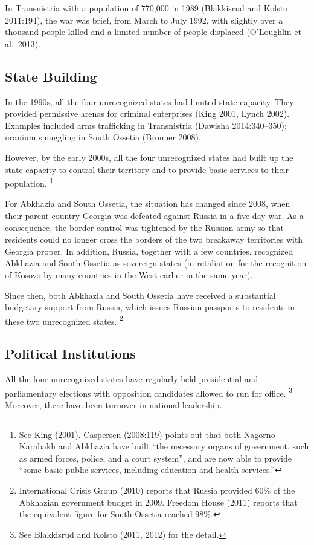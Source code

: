 \documentclass[12pt,a4paper]{article}%
\begin{document}
In Transnistria with a population of 770,000 in 1989 (Blakkisrud and Kolsto 2011:194), the war was brief, from March to July 1992, with slightly over a thousand people killed and a limited number of people displaced (O'Loughlin et al.\ 2013). 

\subsection{State Building}\label{state-building}
In the 1990s, all the four unrecognized states had limited state capacity.
They provided permissive arenas for criminal enterprises (King 2001, Lynch 2002).
Examples included arms trafficking in Transnistria (Dawisha 2014:340--350); uranium smuggling in South Ossetia (Bronner 2008).

However, by the early 2000s, all the four unrecognized states had built up the state capacity to control their territory and to provide basic services to their population.%
\footnote{
	See King (2001). 
	Caspersen (2008:119) points out that both Nagorno-Karabakh and Abkhazia have built ``the necessary organs of government, such as armed forces, police, and a court system'', and are now able to provide ``some basic public services, including education and health services.'' 
}

For Abkhazia and South Ossetia, the situation has changed since 2008, when their parent country Georgia was defeated against Russia in a five-day war. 
As a consequence, the border control was tightened by the Russian army so that residents could no longer cross the borders of the two breakaway territories with Georgia proper.
In addition, Russia, together with a few countries, recognized Abkhazia and South Ossetia as sovereign states (in retaliation for the recognition of Kosovo by many countries in the West earlier in the same year).

Since then, both Abkhazia and South Ossetia have received a substantial budgetary support from Russia, which issues Russian passports to residents in these two unrecognized states.%
\footnote{
	International Crisis Group (2010) reports that Russia provided 60\% of the Abkhazian government budget in 2009.
	Freedom House (2011) reports that the equivalent figure for South Ossetia reached 98\%.
} 

\subsection{Political Institutions}
All the four unrecognized states have regularly held presidential and parliamentary elections with opposition candidates allowed to run for office.%
\footnote{
	See Blakkisrud and Kolsto (2011, 2012) for the detail.
}
Moreover, there have been turnover in national leadership.
\end{document}
